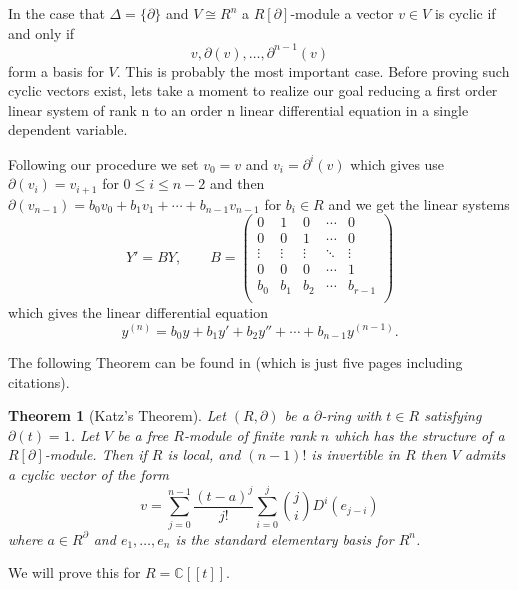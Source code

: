 \documentclass[]{book}
\numberwithin{equation}{section}
\newtheorem{theorem}{Theorem}[subsection]
\theoremstyle{definition}
\theoremstyle{remark}
\newcommand{\CC}{\mathbb{C}}
\begin{document}
In the case that $\Delta = \lbrace \partial \rbrace$ and $V \cong R^n$ a $R[\partial]$-module a vector $v \in V$ is cyclic if and only if 
$$ v, \partial(v), \ldots, \partial^{n-1}(v) $$
form a basis for $V$. 
This is probably the most important case. 
Before proving such cyclic vectors exist, lets take a moment to realize our goal reducing a first order linear system of rank n to an order n linear differential equation in a single dependent variable. 

Following our procedure we set $v_0 = v$ and $v_i = \partial^i(v)$ which gives use $\partial(v_i) = v_{i+1}$ for $0 \leq i \leq n-2$ and then $\partial(v_{n-1}) = b_0v_0 +b_1v_1 + \cdots + b_{n-1} v_{n-1}$ for $b_i \in R$ and we get the linear systems 
$$ Y' = BY, \qquad B=\begin{pmatrix} 0 & 1 & 0&\cdots & 0 \\
0 & 0 & 1 &\cdots & 0 \\
\vdots & \vdots &\vdots & \ddots & \vdots \\
0& 0 & 0 & \cdots & 1 \\
b_0 & b_1 & b_2 & \cdots & b_{r-1} \\
\end{pmatrix}$$
which gives the linear differential equation 
$$ y^{(n)} = b_0 y+b_1y' + b_2 y''+ \cdots + b_{n-1}y^{(n-1)}.$$

The following Theorem can be found in \cite{Katz1987} (which is just five pages including citations). 
\begin{theorem}[Katz's Theorem]\label{T:katz}
	Let $(R,\partial)$ be a $\partial$-ring with $t\in R$ satisfying $\partial(t)=1$.
	Let $V$ be a free $R$-module of finite rank $n$ which has the structure of a $R[\partial]$-module. 
	Then if $R$ is local, and $(n-1)!$ is invertible in $R$ then $V$ admits a cyclic vector of the form
	$$ v = \sum_{j=0}^{n-1} \frac{(t-a)^j}{j!} \sum_{i=0}^j { j \choose i } D^i(e_{j-i}) $$
	where $a \in R^{\partial}$ and $e_1,\ldots,e_n$ is the standard elementary basis for $R^n$.
\end{theorem}
We will prove this for $R=\CC[[t]]$. 
\end{document}
